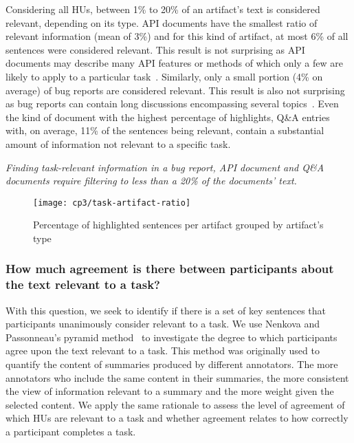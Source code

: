 Considering all HUs, between 1\% to 20\% of an artifact's text is considered relevant, depending on its type.
API documents have the smallest ratio of
relevant information (mean of 3\%) and for this kind of artifact,
at most 6\% of all sentences were considered relevant.
This result is not surprising as API documents may describe many API features or
methods of which only a few are likely to apply to
a particular task~\cite{robillard2011field}.
Similarly, only a small portion (4\% on average) of
bug reports are considered relevant.
This result is also not
surprising as bug reports can contain long discussions encompassing
several topics~\cite{Breu2010, Rastkar2010}.
Even the kind of document with the highest
percentage of highlights, Q\&A entries with, on average, 11\%
of the sentences being relevant,
contain a substantial amount of information not relevant to a
specific task. 







\medskip
\begin{bluequote}
    \textit{Finding task-relevant information in a bug report,
    API document and Q\&A documents require filtering to less than
    a 20\% of the documents' text.}
\end{bluequote}



\begin{figure}
    \centering
    \texttt{[image: cp3/task-artifact-ratio]}
    \caption{Percentage of highlighted sentences per artifact grouped by artifact's type}
    \label{fig:task-artifact-ratio}
\end{figure}

\subsubsection{How much agreement is there between participants about the text relevant to a task?}
\label{cp3:agreement}


With this question, we seek to identify if there is a set of key sentences that
participants unanimously consider relevant to a task. 
We use Nenkova and Passonneau's
pyramid method~\cite{Nenkova2004}
to investigate the degree to which participants agree upon
the text relevant to a task. This method was originally used
to quantify the content of summaries produced by different annotators.
The more annotators who include the same content in their summaries,
the more consistent the view of information relevant to a summary and
the more weight given the selected content. We apply the same rationale
to assess the level of agreement of which HUs are relevant to a task
and whether agreement relates to how correctly
a participant completes a task.




